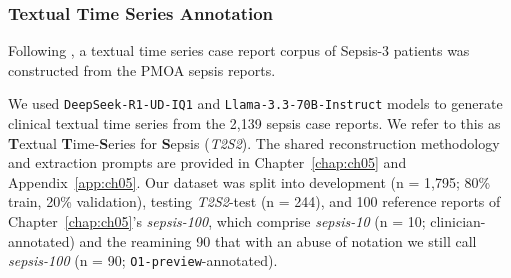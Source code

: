 \subsubsection{Textual Time Series Annotation}
\label{ch07:sec:tts-annotation}

Following \citet{ch07:noroozizadeh2025reconstructing}, a textual time series case report corpus of Sepsis-3 patients was constructed from the PMOA sepsis reports.

We used \texttt{DeepSeek-R1-UD-IQ1} and \texttt{Llama-3.3-70B-Instruct} models to generate clinical textual time series from the 2,139 sepsis case reports.
We refer to this as \textbf{T}extual \textbf{T}ime-\textbf{S}eries for \textbf{S}epsis (\textit{T2S2}).
The shared reconstruction methodology and extraction prompts are provided in Chapter~\ref{chap:ch05} and Appendix~\ref{app:ch05}.
Our dataset was split into development (n = 1,795; 80\% train, 20\% validation), testing \textit{T2S2}-test (n = 244), and 100 reference reports of Chapter~\ref{chap:ch05}'s \textit{sepsis-100}, which comprise \textit{sepsis-10} (n = 10; clinician-annotated) and the reamining 90 that with an abuse of notation we still call \textit{sepsis-100} (n = 90; \texttt{O1-preview}-annotated).
\par
